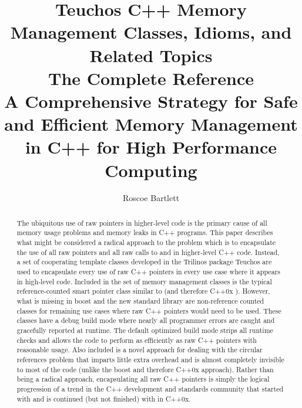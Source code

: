 \documentclass[pdf,ps2pdf,11pt]{SANDreport}
\title{\center
Teuchos C++ Memory Management Classes, Idioms, and Related Topics
\\[2ex] The Complete Reference \\[2ex] {\Large A Comprehensive Strategy for
Safe and Efficient Memory Management in C++ for High Performance
Computing} }
\author{
Roscoe Bartlett
}
\date{}
\begin{document}

\maketitle


%


%
\begin{abstract}
%


The ubiquitous use of raw pointers in higher-level code is the primary
cause of all memory usage problems and memory leaks in C++
programs. This paper describes what might be considered a radical
approach to the problem which is to encapsulate the use of all raw
pointers and all raw calls to {} and {} in
higher-level C++ code.  Instead, a set of cooperating template classes
developed in the Trilinos package Teuchos are used to encapsulate
every use of raw C++ pointers in every use case where it appears in
high-level code.  Included in the set of memory management classes is
the typical reference-counted smart pointer class similar to
{} (and therefore C++0x
{}).  However, what is missing in boost and the
new standard library are non-reference counted classes for remaining
use cases where raw C++ pointers would need to be used.  These classes
have a debug build mode where nearly all programmer errors are caught
and gracefully reported at runtime.  The default optimized build mode
strips all runtime checks and allows the code to perform as
efficiently as raw C++ pointers with reasonable usage.  Also included
is a novel approach for dealing with the circular references problem
that imparts little extra overhead and is almost completely invisible
to most of the code (unlike the boost and therefore C++0x approach).
Rather than being a radical approach, encapsulating all raw C++
pointers is simply the logical progression of a trend in the C++
development and standards community that started with
{} and is continued (but not finished) with
{} in C++0x.

%
\end{abstract}
%

%
%
%
\end{document}
